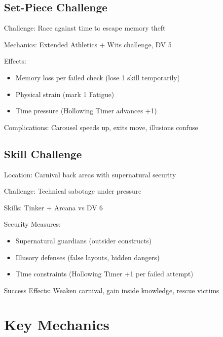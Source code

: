 \documentclass[11pt]{article}
\newenvironment{encounter}[1]{\begin{description}[leftmargin=*,style=standard]\item[\textbf{#1}]}{\end{description}}
\begin{document}
\subsection{Set-Piece Challenge}
\begin{encounter}{Carousel of Echoes Escape}
\item[Challenge:] Race against time to escape memory theft
\item[Mechanics:] Extended Athletics + Wits challenge, DV 5
\item[Effects:] 
  \begin{itemize}
    \item Memory loss per failed check (lose 1 skill temporarily)
    \item Physical strain (mark 1 Fatigue)
    \item Time pressure (Hollowing Timer advances +1)
  \end{itemize}
\item[Complications:] Carousel speeds up, exits move, illusions confuse
\end{encounter}

\subsection{Skill Challenge}
\begin{encounter}{Disabling Dream-Weaving Machinery}
\item[Location:] Carnival back areas with supernatural security
\item[Challenge:] Technical sabotage under pressure
\item[Skills:] Tinker + Arcana vs DV 6
\item[Security Measures:] 
  \begin{itemize}
    \item Supernatural guardians (outsider constructs)
    \item Illusory defenses (false layouts, hidden dangers)
    \item Time constraints (Hollowing Timer +1 per failed attempt)
  \end{itemize}
\item[Success Effects:] Weaken carnival, gain inside knowledge, rescue victims
\end{encounter}

\section{Key Mechanics}
\end{document}
